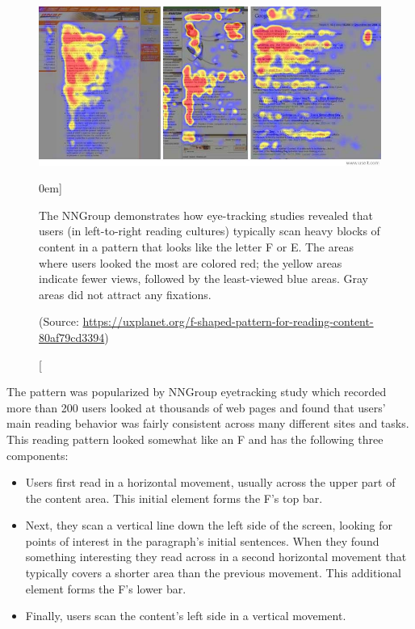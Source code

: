 \begin{figure}%
	\centering
  \includegraphics[width=1\textwidth]{../figures/f-pattern_screens.jpeg}
  \caption[][0em]{The NNGroup demonstrates how eye-tracking studies revealed that users (in left-to-right reading cultures) typically scan heavy blocks of content in a pattern that looks like the letter F or E. The areas where users looked the most are colored red; the yellow areas indicate fewer views, followed by the least-viewed blue areas. Gray areas did not attract any fixations. \par (Source: \url{https://uxplanet.org/f-shaped-pattern-for-reading-content-80af79cd3394})}
  \label{fig:f-layout}
\end{figure}

The pattern was popularized by NNGroup eyetracking study which recorded more than 200 users looked at thousands of web pages and found that users’ main reading behavior was fairly consistent across many different sites and tasks. This reading pattern looked somewhat like an F and has the following three components:

\begin{itemize}
	\item Users first read in a horizontal movement, usually across the upper part of the content area. This initial element forms the F’s top bar.
	
	\item Next, they scan a vertical line down the left side of the screen, looking for points of interest in the paragraph’s initial sentences. When they found something interesting they read across in a second horizontal movement that typically covers a shorter area than the previous movement. This additional element forms the F’s lower bar.
	
	\item Finally, users scan the content’s left side in a vertical movement.
\end{itemize}


